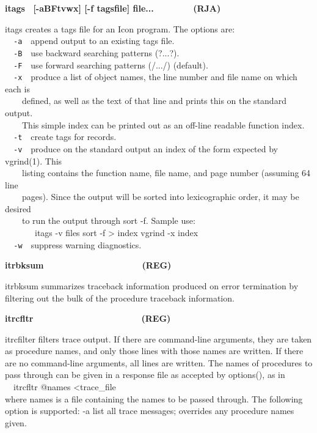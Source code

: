 {\sffamily\bfseries
itags \ \textrm{\textmd{[-aBFtvwx] [-f tagsfile]
file...\ \ \ \ \ \ \ \ }}(RJA)}

\textsf{itags} creates a tags file for an Icon program. The options
are:\\
\ \ \texttt{{}-a}\ \ append output to an existing tags file.\\
\ \ \texttt{{}-B}\ \ use backward searching patterns (?...?).\\
\ \ \texttt{{}-F}\ \ use forward searching patterns (/.../)
(default).\\
\ \ \texttt{{}-x}\ \ produce a list of object names, the line number and
file name on which each is\\
\ \ \ \ defined, as well as the text of that line and prints this on the
standard output.\\
\ \ \ \ This simple index can be printed out as an off-line readable
function index.\\
\ \ \texttt{{}-t}\ \ create tags for records.\\
\ \ \texttt{{}-v}\ \ produce on the standard output an index of the form
expected by vgrind(1). This\\
\ \ \ \ listing contains the function name, file name, and page number
(assuming 64 line\\
\ \ \ \ pages). Since the output will be sorted into lexicographic
order, it may be desired\\
\ \ \ \ to run the output through sort -f. Sample use:\\
\ \ \ \  \ \ \ \textsf{itags -v files {\textbar} sort -f {\textgreater}
index vgrind -x index}\texttt{\\
\ \ {}-w}\ \ suppress warning diagnostics.

{\sffamily\bfseries
itrbksum\ \ \ \ \ \ \ \ \ \ \ \ \ \ \ \ \ \ \ \ (REG)}

\textsf{itrbksum} summarizes traceback information produced on error
termination by filtering out the bulk of the procedure traceback
information.

{\sffamily\bfseries
itrcfltr\ \ \ \ \ \ \ \ \ \ \ \ \ \ \ \ \ \ \ \ \ \ (REG)}

\textsf{itrcfilter} filters trace output. If there are command-line
arguments, they are taken as procedure names, and only those lines with
those names are written. If there are no command-line arguments, all
lines are written. The names of procedures to pass through can be given
in a {\textquotedbl}response{\textquotedbl} file as accepted by
\textsf{options()}, as in\\
\ \ \textsf{itrcfltr @names {\textless}trace\_file}\\
where \textsf{names} is a file containing the names to be passed
through. The following option is supported: \textsf{{}-a} list all
trace messages; overrides any procedure names given.

